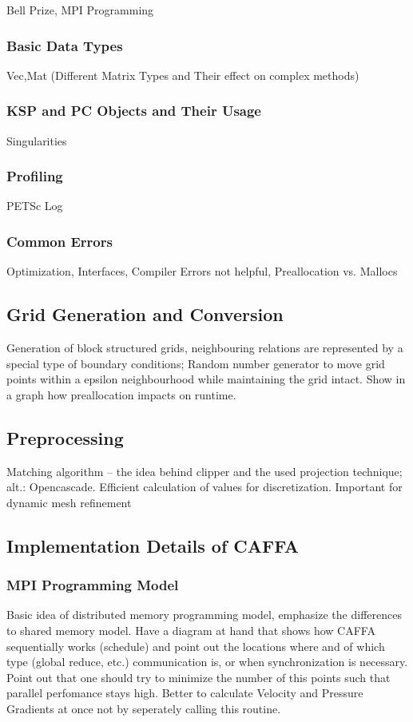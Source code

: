 \documentclass[article,type=msc,colorback,accentcolor=tud2a]{tudthesis}
\begin{document}
        Bell Prize, MPI Programming

      \subsubsection{Basic Data Types}

        Vec,Mat (Different Matrix Types and Their effect on complex methods)

      \subsubsection{KSP and PC Objects and Their Usage}

        Singularities

      \subsubsection{Profiling}

        PETSc Log 

      \subsubsection{Common Errors}

        Optimization, Interfaces, Compiler Errors not helpful, Preallocation vs. Mallocs

    \subsection{Grid Generation and Conversion}

      Generation of block structured grids, neighbouring relations are represented by a special type of boundary conditions; Random number generator to move grid points within a epsilon neighbourhood while maintaining the grid intact. Show in a graph how preallocation impacts on runtime.
    \subsection{Preprocessing}
    Matching algorithm -- the idea behind clipper and the used projection technique; alt.: Opencascade. Efficient calculation of values for discretization. Important for dynamic mesh refinement
    \subsection{Implementation Details of CAFFA}

      \subsubsection{MPI Programming Model}
        Basic idea of distributed memory programming model, emphasize the differences to shared memory model. Have a diagram at hand that shows how CAFFA sequentially works (schedule) and point out the locations where and of which type (global reduce, etc.) communication is, or when synchronization is necessary. Point out that one should try to minimize the number of this points such that parallel perfomance stays high. Better to calculate Velocity and Pressure Gradients at once not by seperately calling this routine.
\end{document}
